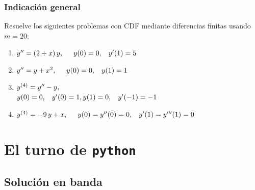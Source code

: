 \documentclass[12pt]{beamer}
\begin{document}
\begin{frame}
\frametitle{Indicación general}
Resuelve los siguientes problemas con CDF mediante diferencias finitas usando $m = 20$:
\pause
{}
\begin{enumerate}
\item ${y}^{\prime \prime} = (2 + x) \, y, \hspace{0.5cm} y (0) = 0, \hspace{0.3cm} {y}^{\prime} (1) = 5$
\item ${y}^{\prime \prime} = y + x^{2}, \hspace{0.5cm} y (0) = 0, \hspace{0.3cm} y (1) = 1$
\item ${y}^{(4)} = {y}^{\prime \prime} - y, $ \\
$y (0) = 0, \hspace{0.3cm} {y}^{\prime} (0) = 1, y (1) = 0, \hspace{0.3cm} {y}^{\prime} (-1) =  -1$
\item ${y}^{(4)} = - 9 \, y + x, \hspace{0.5cm} y (0) = {y}^{\prime \prime} (0) = 0, \hspace{0.3cm} {y}^{\prime} (1) = {y}^{\prime \prime \prime} (1) = 0$
\end{enumerate}
\end{frame}

\section{El turno de \texttt{python}}
\subsection{Solución en banda}
\end{document}

